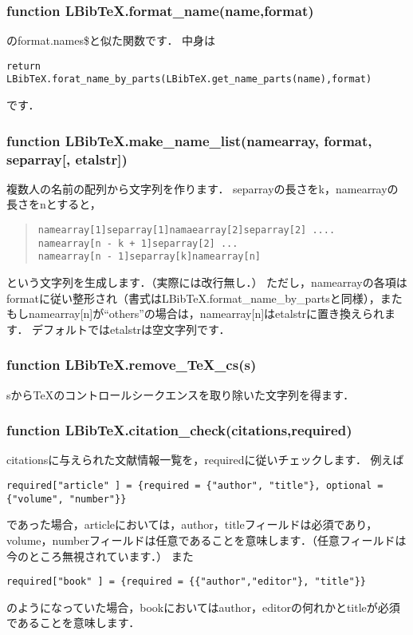 \documentclass[dvipdfmx,a4paper]{jsarticle}
\begin{document}
\subsubsection{function LBibTeX.format\_name(name,format)}
\BibTeX のformat.names\$と似た関数です．
中身は
\begin{lstlisting}
return LBibTeX.forat_name_by_parts(LBibTeX.get_name_parts(name),format)
\end{lstlisting}
です．

\subsubsection{function LBibTeX.make\_name\_list(namearray, format, separray[, etalstr])}
複数人の名前の配列から文字列を作ります．
separrayの長さをk，namearrayの長さをnとすると，
\begin{quote}
\begin{verbatim}
namearray[1]separray[1]namaearray[2]separray[2] .... 
namearray[n - k + 1]separray[2] ...
namearray[n - 1]separray[k]namearray[n]
\end{verbatim}
\end{quote}
という文字列を生成します．（実際には改行無し．）
ただし，namearrayの各項はformatに従い整形され（書式はLBibTeX.format\_name\_by\_partsと同様），またもしnamearray[n]が``others''の場合は，namearray[n]はetalstrに置き換えられます．
デフォルトではetalstrは空文字列です．

\subsubsection{function LBibTeX.remove\_TeX\_cs(s)}
sから\TeX のコントロールシークエンスを取り除いた文字列を得ます．

\subsubsection{function LBibTeX.citation\_check(citations,required)}
citationsに与えられた文献情報一覧を，requiredに従いチェックします．
例えば
\begin{lstlisting}
required["article" ] = {required = {"author", "title"}, optional = {"volume", "number"}}
\end{lstlisting}
であった場合，articleにおいては，author，titleフィールドは必須であり，volume，numberフィールドは任意であることを意味します．（任意フィールドは今のところ無視されています．）
また
\begin{lstlisting}
required["book" ] = {required = {{"author","editor"}, "title"}}
\end{lstlisting}
のようになっていた場合，bookにおいてはauthor，editorの何れかとtitleが必須であることを意味します．
\end{document}
